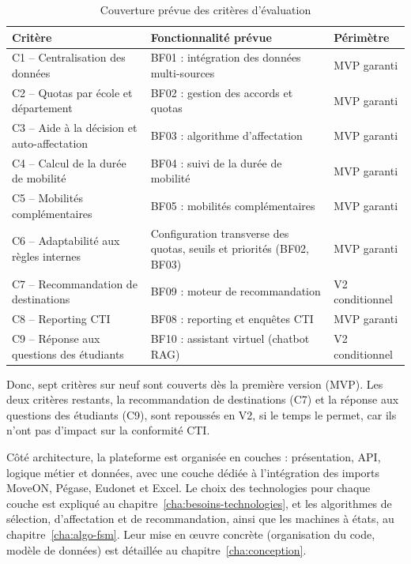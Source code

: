 \renewcommand{\arraystretch}{1.4}
\begin{table}[H]
\centering
\caption{Couverture prévue des critères d'évaluation}
\label{tab:couverture_criteres}
\footnotesize
\begin{tabular}{|p{5cm}|p{5.5cm}|p{2.7cm}|}
\hline
\rowcolor{gray!20}
\textbf{Critère} & \textbf{Fonctionnalité prévue} & \textbf{Périmètre} \\
\hline
C1 -- Centralisation des données & BF01 : intégration des données multi-sources & MVP garanti \\
\hline
C2 -- Quotas par école et département & BF02 : gestion des accords et quotas & MVP garanti \\
\hline
C3 -- Aide à la décision et auto-affectation & BF03 : algorithme d'affectation & MVP garanti \\
\hline
C4 -- Calcul de la durée de mobilité & BF04 : suivi de la durée de mobilité & MVP garanti \\
\hline
C5 -- Mobilités complémentaires & BF05 : mobilités complémentaires & MVP garanti \\
\hline
C6 -- Adaptabilité aux règles internes & Configuration transverse des quotas, seuils et priorités (BF02, BF03) & MVP garanti \\
\hline
C7 -- Recommandation de destinations & BF09 : moteur de recommandation & V2 conditionnel \\
\hline
C8 -- Reporting CTI & BF08 : reporting et enquêtes CTI & MVP garanti \\
\hline
C9 -- Réponse aux questions des étudiants & BF10 : assistant virtuel (chatbot RAG) & V2 conditionnel \\
\hline
\end{tabular}
\end{table}

Donc, sept critères sur neuf sont couverts dès la première version (MVP). Les deux critères restants, la recommandation de destinations (C7) et la réponse aux questions des étudiants (C9), sont repoussés en V2, si le temps le permet, car ils n'ont pas d'impact sur la conformité CTI.

Côté architecture, la plateforme est organisée en couches : présentation, API, logique métier et données, avec une couche dédiée à l'intégration des imports MoveON, Pégase, Eudonet et Excel. Le choix des technologies pour chaque couche est expliqué au chapitre~\ref{cha:besoins-technologies}, et les algorithmes de sélection, d'affectation et de recommandation, ainsi que les machines à états, au chapitre~\ref{cha:algo-fsm}. Leur mise en œuvre concrète (organisation du code, modèle de données) est détaillée au chapitre~\ref{cha:conception}.


